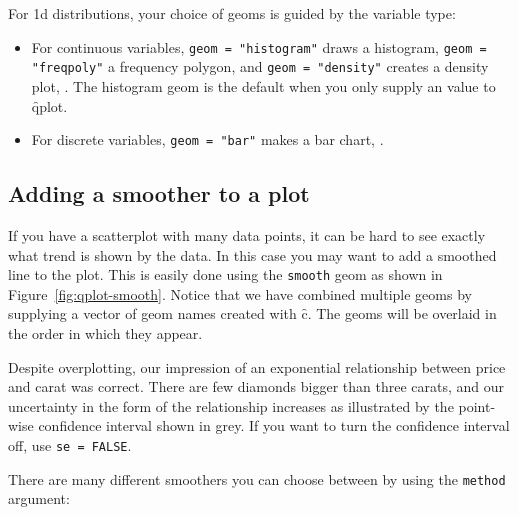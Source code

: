 \noindent For 1d distributions, your choice of geoms is guided by the variable type:

\begin{itemize}
  \item For continuous variables, {\tt geom = "histogram"} draws a histogram, {\tt geom = "freqpoly"} a frequency polygon, and {\tt geom = "density"} creates a density plot, .  The histogram geom is the default when you only supply an  value to \f{qplot}.

  \item For discrete variables, {\tt geom = "bar"} makes a bar chart, .

\end{itemize}


\subsection{Adding a smoother to a plot}\label{sub:smooth}

If you have a scatterplot with many data points, it can be hard to see exactly what trend is shown by the data. In this case you may want to add a smoothed line to the plot. This is easily done using the {\tt smooth} geom as shown in Figure~\ref{fig:qplot-smooth}. Notice that we have combined multiple geoms by supplying a vector of geom names created with \f{c}.  The geoms will be overlaid in the order in which they appear.  

% 


Despite overplotting, our impression of an exponential relationship between price and carat was correct. There are few diamonds bigger than three carats, and our uncertainty in the form of the relationship increases as illustrated by the point-wise confidence interval shown in grey. If you want to turn the confidence interval off, use {\tt se = FALSE}. 

There are many different smoothers you can choose between by using the {\tt method} argument:

